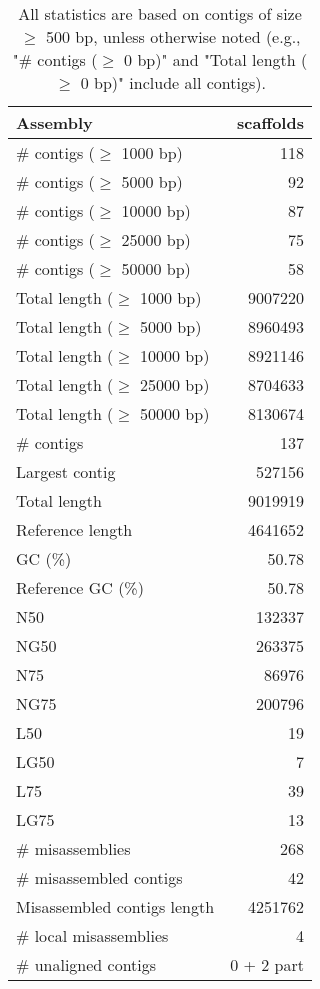 \documentclass[12pt,a4paper]{article}
\begin{document}
\begin{table}[ht]
\begin{center}
\caption{All statistics are based on contigs of size $\geq$ 500 bp, unless otherwise noted (e.g., "\# contigs ($\geq$ 0 bp)" and "Total length ($\geq$ 0 bp)" include all contigs).}
\begin{tabular}{|l*{1}{|r}|}
\hline
Assembly & scaffolds \\ \hline
\# contigs ($\geq$ 1000 bp) & 118 \\ \hline
\# contigs ($\geq$ 5000 bp) & 92 \\ \hline
\# contigs ($\geq$ 10000 bp) & 87 \\ \hline
\# contigs ($\geq$ 25000 bp) & 75 \\ \hline
\# contigs ($\geq$ 50000 bp) & 58 \\ \hline
Total length ($\geq$ 1000 bp) & 9007220 \\ \hline
Total length ($\geq$ 5000 bp) & 8960493 \\ \hline
Total length ($\geq$ 10000 bp) & 8921146 \\ \hline
Total length ($\geq$ 25000 bp) & 8704633 \\ \hline
Total length ($\geq$ 50000 bp) & 8130674 \\ \hline
\# contigs & 137 \\ \hline
Largest contig & 527156 \\ \hline
Total length & 9019919 \\ \hline
Reference length & 4641652 \\ \hline
GC (\%) & 50.78 \\ \hline
Reference GC (\%) & 50.78 \\ \hline
N50 & 132337 \\ \hline
NG50 & 263375 \\ \hline
N75 & 86976 \\ \hline
NG75 & 200796 \\ \hline
L50 & 19 \\ \hline
LG50 & 7 \\ \hline
L75 & 39 \\ \hline
LG75 & 13 \\ \hline
\# misassemblies & 268 \\ \hline
\# misassembled contigs & 42 \\ \hline
Misassembled contigs length & 4251762 \\ \hline
\# local misassemblies & 4 \\ \hline
\# unaligned contigs & 0 + 2 part \\ \hline

\end{tabular}
\end{center}
\end{table}
\end{document}
